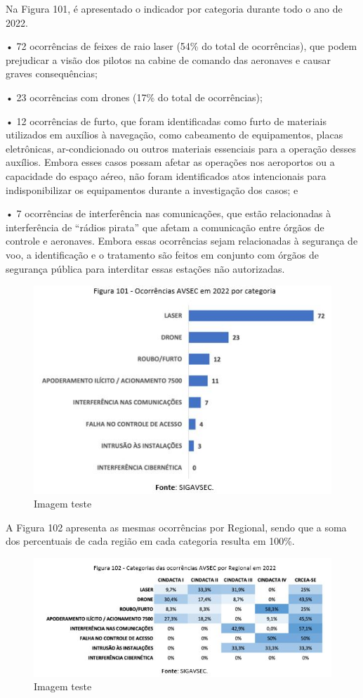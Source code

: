 \documentclass[
]{book}
\begin{document}
Na Figura 101, é apresentado o indicador por categoria durante todo o ano de 2022.

• 72 ocorrências de feixes de raio laser (54\% do total de ocorrências), que podem prejudicar a visão dos pilotos na cabine de comando das aeronaves e causar graves consequências;

• 23 ocorrências com drones (17\% do total de ocorrências);

• 12 ocorrências de furto, que foram identificadas como furto de materiais utilizados em auxílios à navegação, como cabeamento de equipamentos, placas eletrônicas, ar-condicionado ou outros materiais essenciais para a operação desses auxílios. Embora esses casos possam afetar as operações nos aeroportos ou a capacidade do espaço aéreo, não foram identificados atos intencionais para indisponibilizar os equipamentos durante a investigação dos casos; e

• 7 ocorrências de interferência nas comunicações, que estão relacionadas à interferência de ``rádios pirata'' que afetam a comunicação entre órgãos de controle e aeronaves. Embora essas ocorrências sejam relacionadas à segurança de voo, a identificação e o tratamento são feitos em conjunto com órgãos de segurança pública para interditar essas estações não autorizadas.

\begin{figure}
\centering
\includegraphics{imagens/fig88.jpg}
\caption{Imagem teste}
\end{figure}

A Figura 102 apresenta as mesmas ocorrências por Regional, sendo que a soma dos percentuais de cada região em cada categoria resulta em 100\%.

\begin{figure}
\centering
\includegraphics{imagens/fig89.jpg}
\caption{Imagem teste}
\end{figure}
\end{document}
